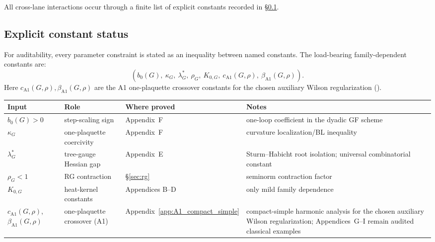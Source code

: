 All cross-lane interactions occur through a finite list of explicit constants recorded in \S\ref{sec:roadmap_constants}.

\subsection{Explicit constant status}
\label{sec:roadmap_constants}

For auditability, every parameter constraint is stated as an inequality between named constants.
The load-bearing family-dependent constants are:
\begin{equation}
\label{eq:constant_tuple}
(b_0(G),\ \kappa_G,\ \lambda^*_G,\ \rho_G,\ K_{0,G},\ c_{\mathrm{A1}}(G,\rho),\ \beta_{\mathrm{A1}}(G,\rho)).
\end{equation}
Here $c_{\mathrm{A1}}(G,\rho),\beta_{\mathrm{A1}}(G,\rho)$ are the A1 one-plaquette crossover constants for the chosen auxiliary Wilson regularization ().

\begingroup
\small
\begin{longtable}{@{}
>{\RaggedRight\arraybackslash}p{}
>{\RaggedRight\arraybackslash}p{}
>{\RaggedRight\arraybackslash}p{}
>{\RaggedRight\arraybackslash}p{}
@{}}
\toprule
\textbf{Input} & \textbf{Role} & \textbf{Where proved} & \textbf{Notes} \\
\midrule
\endhead
$b_0(G)>0$ & step-scaling sign & Appendix~F & one-loop coefficient in the dyadic GF scheme \\
$\kappa_G$ & one-plaquette coercivity & Appendix~F & curvature localization/BL inequality \\
$\lambda^*_G$ & tree-gauge Hessian gap & Appendix~E & Sturm--Habicht root isolation; universal combinatorial constant \\
$\rho_G<1$ & RG contraction & \S\ref{sec:rg} & seminorm contraction factor \\
$K_{0,G}$ & heat-kernel constants & Appendices B--D & only mild family dependence \\
$c_{\mathrm{A1}}(G,\rho)$, $\beta_{\mathrm{A1}}(G,\rho)$ & one-plaquette crossover (A1) & Appendix~\ref{app:A1_compact_simple} & compact-simple harmonic analysis for the chosen auxiliary Wilson regularization; Appendices~G--I remain audited classical examples \\
\bottomrule
\end{longtable}
\endgroup

